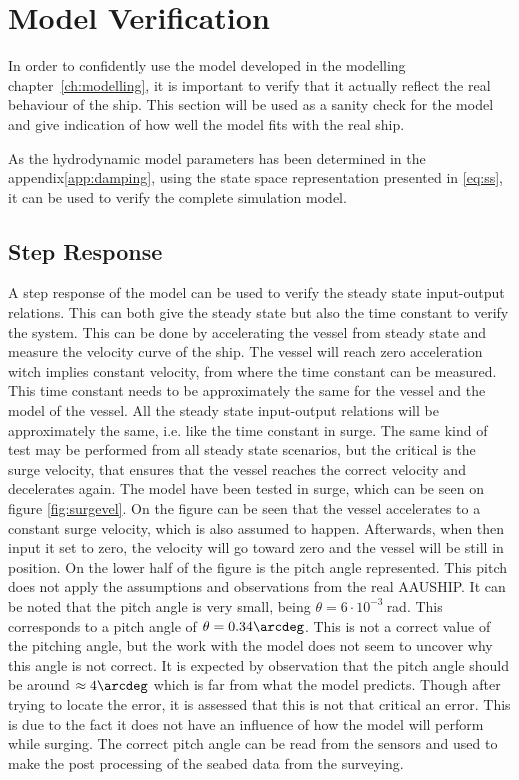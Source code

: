 \section{Model Verification}
\label{sec:model_verification}
In order to confidently use the model developed in the modelling chapter~\vref{ch:modelling}, it is important to verify that it actually reflect the real behaviour of the ship. This section will be used as a sanity check for the model and give indication of how well the model fits with the real ship.

As the hydrodynamic model parameters has been determined in the appendix\vref{app:damping}, using the state space representation presented in \vref{eq:ss}, it can be used to verify the complete simulation model.

\subsection{Step Response}
A step response of the model can be used to verify the steady state input-output relations. This can both give the steady state but also the time constant to verify the system. This can be done by accelerating the vessel from steady state and measure the velocity curve of the ship. The vessel will reach zero acceleration witch implies constant velocity, from where the time constant can be measured. This time constant needs to be approximately the same for the vessel and the model of the vessel. All the steady state input-output relations will be approximately the same, i.e. like the time constant in surge. The same kind of test may be performed from all steady state scenarios, but the critical is the surge velocity, that ensures that the vessel reaches the correct velocity and decelerates again. The model have been tested in surge, which can be seen on figure \ref{fig:surgevel}. On the figure can be seen that the vessel accelerates to a constant surge velocity, which is also assumed to happen. Afterwards, when then input it set to zero, the velocity will go toward zero and the vessel will be still in position. On the lower half of the figure is the pitch angle represented. This pitch does not apply the assumptions and observations from the real AAUSHIP. It can be noted that the pitch angle is very small, being $\theta = 6\cdot 10^{-3}\ $rad. This corresponds to a pitch angle of $\theta = 0.34\arcdeg$. This is not a correct value of the pitching angle, but the work with the model does not seem to uncover why this angle is not correct. It is expected by observation that the pitch angle should be around $\approx 4 \arcdeg$ which is far from what the model predicts. Though after trying to locate the error, it is assessed that this is not that critical an error. This is due to the fact it does not have an influence of how the model will perform while surging. The correct pitch angle can be read from the sensors and used to make the post processing of the seabed data from the surveying.

